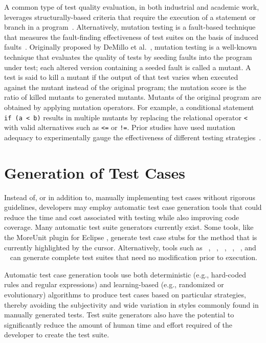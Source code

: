 A common type of test quality evaluation, in both industrial and academic work,
leverages structurally-based criteria that require the execution of a statement
or branch in a program~\cite{weyuker1988evaluation}.  Alternatively, mutation
testing is a fault-based technique that measures the fault-finding effectiveness
of test suites on the basis of induced faults~\cite{demillo1978hints,
hamlet1977testing}.  Originally proposed by DeMillo et
al.~\cite{demillo1978hints}, mutation testing is a well-known technique that
evaluates the quality of tests by seeding faults into the program under test;
each altered version containing a seeded fault is called a mutant. A test is
said to kill a mutant if the output of that test varies when executed against
the mutant instead of the original program; the mutation score is the ratio of
killed mutants to generated mutants. Mutants of the original program are
obtained by applying mutation operators. For example, a conditional statement
\texttt{if (a < b)} results in multiple mutants by replacing the relational
operator \texttt{<} with valid alternatives such as \texttt{<=} or \texttt{!=}.
Prior studies have used mutation adequacy to experimentally gauge the
effectiveness of different testing
strategies~\cite{andrews2005mutation,andrews2006,do2006,just2014}.  

\section{Generation of Test Cases}

Instead of, or in addition to, manually implementing test cases without rigorous
guidelines, developers may employ automatic test case generation tools that
could reduce the time and cost associated with testing while also improving code
coverage.  Many automatic test suite generators currently exist.  Some tools,
like the MoreUnit plugin for Eclipse \cite{moreunit}, generate test case stubs
for the method that is currently highlighted by the cursor.  Alternatively,
tools such as \codepro~\cite{CodePro1},
\evo~\cite{fraser:2011:eat:2025113.2025179}, \jcrasher~\cite{csallner2004},
\palus~\cite{zhang:2011:pha:1985793.1986036},
\randoop~\cite{pacheco2007feedback}, and
\testera~\cite{marinov:2001:tnf:872023.872551} can generate complete test suites
that need no modification prior to execution.

Automatic test case generation tools use both deterministic (e.g., hard-coded
rules and regular expressions) and learning-based (e.g., randomized or
evolutionary) algorithms to produce test cases based on particular strategies,
thereby avoiding the subjectivity and wide variation in styles commonly found in
manually generated tests.  Test suite generators also have the potential to
significantly reduce the amount of human time and effort required of the
developer to create the test suite.  




